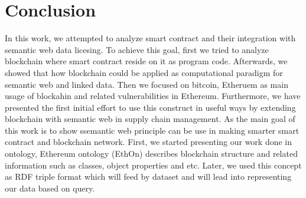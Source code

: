 \chapter{Conclusion}
In this work, we attempted to analyze smart contract and their integration with semantic web data licesing. To achieve this goal, first we tried to analyze blockchain where smart contract reside on it as program code. Afterwards, we showed that how blockchain could be applied as computational paradigm for semantic web and linked data. Then we focused on bitcoin, Etheruem as main usage of blockahin and related vulnerabilities in Ethereum.
Furthermore, we have presented the first initial effort to use this construct in useful ways by extending blockchain with semantic web in supply chain management. As the main goal of this work is to show ssemantic web principle can be use in making smarter smart contract and blockchain network. First, we started presenting our work done in ontology, Ethereum ontology (EthOn) describes blockchain structure and related information such as classes, object properties and etc. Later, we used this concept as RDF triple format which will feed by dataset and will lead into representing our data based on query.